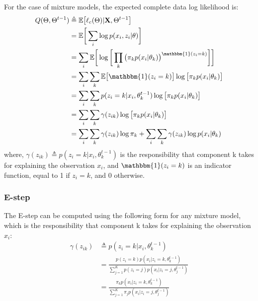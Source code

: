 For the case of mixture models, the expected complete data log likelihood is:
\begin{equation} \label{log-lik-expected-derivation-f-mm}
	\begin{aligned}
		Q(\Theta, \Theta^{t-1}) & \triangleq \mathbb{E} \big[\ell_{c}(\Theta) | \mathbf{X}, \Theta^{t-1}\big] \\
								& = \mathbb{E} \bigg[ \sum_{i} \log p(x_{i}, z_{i}|\theta) \bigg] \\
								& = \sum_{i} \mathbb{E} \bigg[ \log \bigg[\prod_{k} \big( \pi_{k}p(x_{i}|\theta_{k})\big)^{\mathbbm{1}(z_{i}=k)} \bigg]\bigg] \\
								& = \sum_{i} \sum_{k} \mathbb{E} \big[\mathbbm{1}(z_{i}=k)\big] \log \big[\pi_{k}p(x_{i}|\theta_{k})\big] \\
								& = \sum_{i} \sum_{k} p(z_{i}=k|x_{i},\theta_{k}^{t-1}) \log \big[\pi_{k}p(x_{i}|\theta_{k})\big] \\
								& = \sum_{i} \sum_{k} \gamma(z_{ik}) \log \big[\pi_{k}p(x_{i}|\theta_{k})\big] \\
								& = \sum_{i} \sum_{k} \gamma(z_{ik}) \log \pi_{k} + \sum_{i} \sum_{k} \gamma(z_{ik}) \log p(x_{i}|\theta_{k}) \\		
	\end{aligned}
\end{equation}
where, $\gamma(z_{ik}) \triangleq p(z_{i}=k|x_{i},\theta_{k}^{t-1})$ is the responsibility that component k takes for explaining the observation $x_{i}$, and $\mathbbm{1}(z_{i}=k)$ is an indicator function, equal to 1 if $z_{i}=k$, and 0 otherwise.

\subsubsection{E-step}
The E-step can be computed using the following form for any mixture model, which is the responsibility that component k takes for explaining the observation $x_{i}$:
\begin{equation} \label{responsibilities-f-mm}
  \begin{aligned}
	\gamma(z_{ik}) & \triangleq p(z_{i}=k|x_{i},\theta_{k}^{t-1}) \\
				   & = \frac{p(z_{i}=k)p(x_{i}|z_{i}=k,\theta_{k}^{t-1})}{\sum\limits_{j=1}^{K} p(z_{i}=j)p(x_{i}|z_{i}=j,\theta_{j}^{t-1})} \\
				   & = \frac{\pi_{k}p(x_{i}|z_{i}=k,\theta_{k}^{t-1})}{\sum\limits_{j=1}^{K} \pi_{j}p(x_{i}|z_{i}=j,\theta_{j}^{t-1})}
  \end{aligned}
\end{equation}

